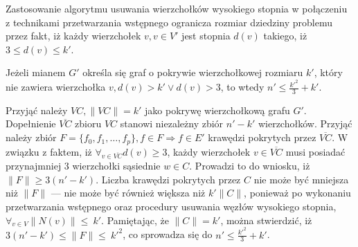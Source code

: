 Zastosowanie algorytmu usuwania wierzchołków wysokiego stopnia w połączeniu z
technikami przetwarzania wstępnego ogranicza rozmiar dziedziny problemu przez
fakt, iż każdy wierzchołek $v, v \in V\prime$ jest stopnia $d(v)$ takiego, iż
$3 \leq d(v) \leq k\prime$.

\begin{theorem}
  Jeżeli mianem $G\prime$ określa się graf o pokrywie wierzchołkowej rozmiaru
  $k\prime$, który nie zawiera wierzchołka $v, d(v) > k\prime \lor d(v) > 3$, to
  wtedy $n\prime \leq \frac{k\prime^2}{3} + k\prime$.
\end{theorem}
\begin{bproof}
  Przyjąć należy ${VC,\|VC\|=k\prime}$ jako pokrywę wierzchołkową grafu
  $G\prime$.
  Dopełnienie $\overline{VC}$ zbioru $VC$ stanowi niezależny zbiór
  $n\prime-k\prime$ wierzchołków.
  Przyjąć należy zbiór $F=\{f_0,f_1, \ldots, f_p\}, f \in F \Rightarrow f \in E\prime$
  krawędzi pokrytych przez $\overline{VC}$.
  W związku z faktem, iż $\forall_{v \in \overline{VC}}{d(v) \geq 3}$, każdy
  wierzchołek $v \in \overline{VC}$ musi posiadać przynajmniej 3 wierzchołki sąsiednie
  $w \in C$.
  Prowadzi to do wniosku, iż $\|F\| \geq 3(n\prime - k\prime)$.
  Liczba krawędzi pokrytych przez $C$ nie może być mniejsza niż $\|F\|$ --- nie
  może być również większa niż $k\prime\|C\|$, ponieważ po wykonaniu
  przetwarzania wstępnego oraz procedury usuwania węzłów wysokiego stopnia,
  $\forall_{v \in V}{\|N(v)\|\leq~k\prime}$.
  Pamiętając, że $\|C\|=k\prime$, można stwierdzić, iż
  ${3(n\prime-k\prime)\leq\|F\|\leq~k\prime^2}$, co sprowadza się do
  ${n\prime\leq\frac{k\prime^2}{3}+k\prime}$.
\end{bproof}


